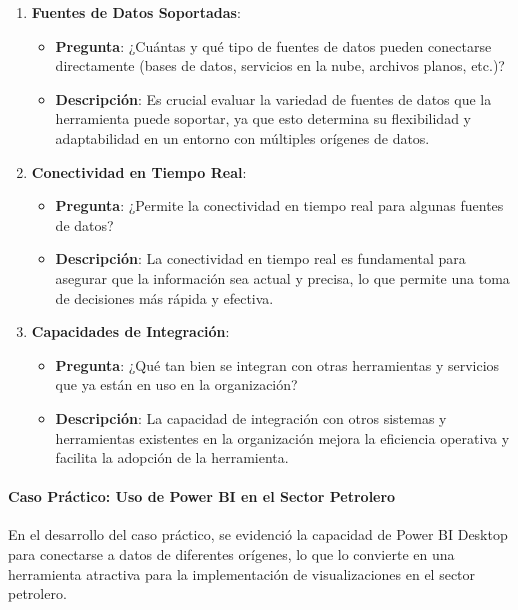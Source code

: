 \documentclass[
  11pt,
  bookmarksnumbered]{article}
\begin{document}
\begin{enumerate}
\def\labelenumi{\arabic{enumi}.}
\item
  \textbf{Fuentes de Datos Soportadas}:

  \begin{itemize}
  \item
    \textbf{Pregunta}: ¿Cuántas y qué tipo de fuentes de datos pueden conectarse directamente (bases de datos, servicios en la nube, archivos planos, etc.)?
  \item
    \textbf{Descripción}: Es crucial evaluar la variedad de fuentes de datos que la herramienta puede soportar, ya que esto determina su flexibilidad y adaptabilidad en un entorno con múltiples orígenes de datos.
  \end{itemize}
\item
  \textbf{Conectividad en Tiempo Real}:

  \begin{itemize}
  \item
    \textbf{Pregunta}: ¿Permite la conectividad en tiempo real para algunas fuentes de datos?
  \item
    \textbf{Descripción}: La conectividad en tiempo real es fundamental para asegurar que la información sea actual y precisa, lo que permite una toma de decisiones más rápida y efectiva.
  \end{itemize}
\item
  \textbf{Capacidades de Integración}:

  \begin{itemize}
  \item
    \textbf{Pregunta}: ¿Qué tan bien se integran con otras herramientas y servicios que ya están en uso en la organización?
  \item
    \textbf{Descripción}: La capacidad de integración con otros sistemas y herramientas existentes en la organización mejora la eficiencia operativa y facilita la adopción de la herramienta.
  \end{itemize}
\end{enumerate}

\hypertarget{caso-pruxe1ctico-uso-de-power-bi-en-el-sector-petrolero}{%
\paragraph{Caso Práctico: Uso de Power BI en el Sector Petrolero}\label{caso-pruxe1ctico-uso-de-power-bi-en-el-sector-petrolero}}

En el desarrollo del caso práctico, se evidenció la capacidad de Power BI Desktop para conectarse a datos de diferentes orígenes, lo que lo convierte en una herramienta atractiva para la implementación de visualizaciones en el sector petrolero.
\end{document}
